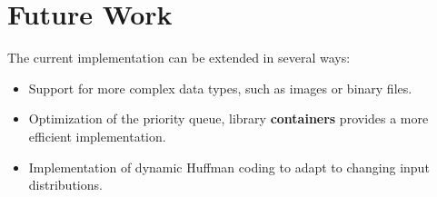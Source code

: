 \documentclass{article}
\begin{document}
\section{Future Work}

The current implementation can be extended in several ways:
\begin{itemize}
    \item Support for more complex data types, such as images or binary files.
    \item Optimization of the priority queue, library \textbf{containers} provides a more efficient implementation.
    \item Implementation of dynamic Huffman coding to adapt to changing input distributions.
\end{itemize}



\end{document}
